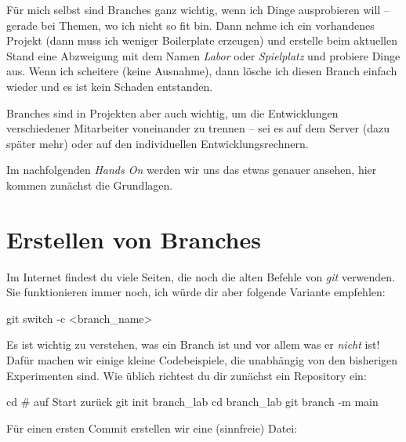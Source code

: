 \documentclass[
  ngerman,
  letterpaper,
  DIV=11]{scrreprt}
\newenvironment{Shaded}{\begin{snugshade}}{\end{snugshade}}
\newcommand{\AttributeTok}[1]{\textcolor[rgb]{0.40,0.45,0.13}{#1}}
\newcommand{\BuiltInTok}[1]{\textcolor[rgb]{0.00,0.23,0.31}{#1}}
\newcommand{\CommentTok}[1]{\textcolor[rgb]{0.37,0.37,0.37}{#1}}
\newcommand{\FunctionTok}[1]{\textcolor[rgb]{0.28,0.35,0.67}{#1}}
\newcommand{\NormalTok}[1]{\textcolor[rgb]{0.00,0.23,0.31}{#1}}
\newcommand{\OperatorTok}[1]{\textcolor[rgb]{0.37,0.37,0.37}{#1}}
\newcommand{\git}{\textit{git}\xspace}
\begin{document}
Für mich selbst sind Branches ganz wichtig, wenn ich Dinge ausprobieren
will -- gerade bei Themen, wo ich nicht so fit bin. Dann nehme ich ein
vorhandenes Projekt (dann muss ich weniger Boilerplate erzeugen) und
erstelle beim aktuellen Stand eine Abzweigung mit dem Namen \emph{Labor}
oder \emph{Spielplatz} und probiere Dinge aus. Wenn ich scheitere (keine
Ausnahme), dann lösche ich diesen Branch einfach wieder und es ist kein
Schaden entstanden.

Branches sind in Projekten aber auch wichtig, um die Entwicklungen
verschiedener Mitarbeiter voneinander zu trennen -- sei es auf dem
Server (dazu später mehr) oder auf den individuellen
Entwicklungsrechnern.

Im nachfolgenden \emph{Hands On} werden wir uns das etwas genauer
ansehen, hier kommen zunächst die Grundlagen.

\section{Erstellen von Branches}\label{erstellen-von-branches}

Im Internet findest du viele Seiten, die noch die alten Befehle von
\git  verwenden. Sie funktionieren immer noch, ich würde dir aber
folgende Variante empfehlen:

\begin{Shaded}
\begin{Highlighting}[]
\FunctionTok{git}\NormalTok{ switch }\AttributeTok{{-}c} \OperatorTok{\textless{}}\NormalTok{branch\_name}\OperatorTok{\textgreater{}}
\end{Highlighting}
\end{Shaded}

Es ist wichtig zu verstehen, was ein Branch ist und vor allem was er
\emph{nicht} ist! Dafür machen wir einige kleine Codebeispiele, die
unabhängig von den bisherigen Experimenten sind. Wie üblich richtest du
dir zunächst ein Repository ein:

\begin{Shaded}
\begin{Highlighting}[]
\BuiltInTok{cd}        \CommentTok{\# auf Start zurück}
\FunctionTok{git}\NormalTok{ init branch\_lab}
\BuiltInTok{cd}\NormalTok{ branch\_lab }
\FunctionTok{git}\NormalTok{ branch }\AttributeTok{{-}m}\NormalTok{ main }
\end{Highlighting}
\end{Shaded}

Für einen ersten Commit erstellen wir eine (sinnfreie) Datei:
\end{document}
